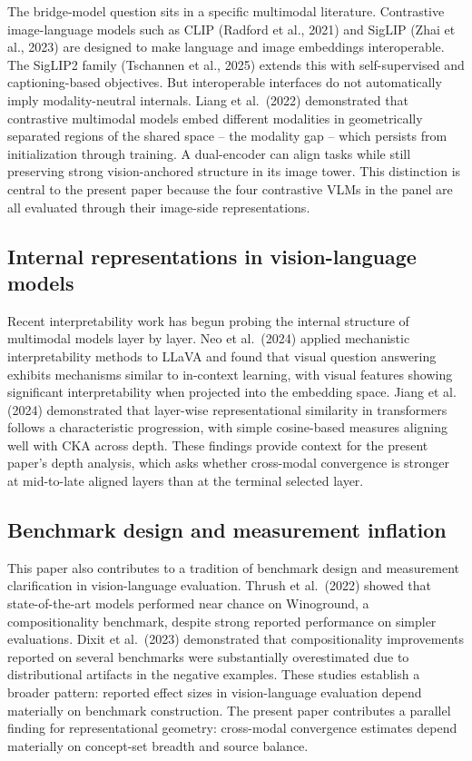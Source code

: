 \documentclass[11pt,a4paper]{article}
\begin{document}
The bridge-model question sits in a specific multimodal literature.
Contrastive image-language models such as CLIP (Radford et al., 2021)
and SigLIP (Zhai et al., 2023) are designed to make language and image
embeddings interoperable. The SigLIP2 family (Tschannen et al., 2025)
extends this with self-supervised and captioning-based objectives. But
interoperable interfaces do not automatically imply modality-neutral
internals. Liang et al.~(2022) demonstrated that contrastive multimodal
models embed different modalities in geometrically separated regions of
the shared space -- the modality gap -- which persists from
initialization through training. A dual-encoder can align tasks while
still preserving strong vision-anchored structure in its image tower.
This distinction is central to the present paper because the four
contrastive VLMs in the panel are all evaluated through their image-side
representations.

\subsection{Internal representations in vision-language
models}\label{internal-representations-in-vision-language-models}

Recent interpretability work has begun probing the internal structure of
multimodal models layer by layer. Neo et al.~(2024) applied mechanistic
interpretability methods to LLaVA and found that visual question
answering exhibits mechanisms similar to in-context learning, with
visual features showing significant interpretability when projected into
the embedding space. Jiang et al. (2024) demonstrated that layer-wise
representational similarity in transformers follows a characteristic
progression, with simple cosine-based measures aligning well with CKA
across depth. These findings provide context for the present paper's
depth analysis, which asks whether cross-modal convergence is stronger
at mid-to-late aligned layers than at the terminal selected layer.

\subsection{Benchmark design and measurement
inflation}\label{benchmark-design-and-measurement-inflation}

This paper also contributes to a tradition of benchmark design and
measurement clarification in vision-language evaluation. Thrush et
al.~(2022) showed that state-of-the-art models performed near chance on
Winoground, a compositionality benchmark, despite strong reported
performance on simpler evaluations. Dixit et al.~(2023) demonstrated
that compositionality improvements reported on several benchmarks were
substantially overestimated due to distributional artifacts in the
negative examples. These studies establish a broader pattern: reported
effect sizes in vision-language evaluation depend materially on
benchmark construction. The present paper contributes a parallel finding
for representational geometry: cross-modal convergence estimates depend
materially on concept-set breadth and source balance.
\end{document}
